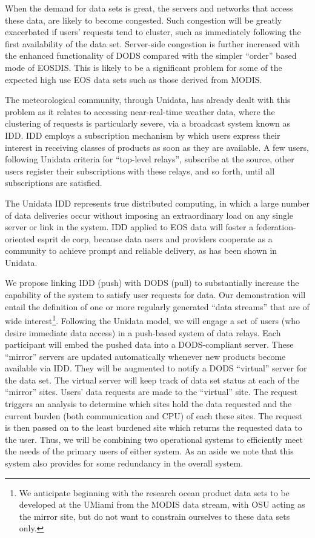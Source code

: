 \documentclass[12pt]{article}
\begin{document}
When the demand for data sets is great, the servers and networks that
access these data, are likely to become congested. Such congestion will 
be greatly exacerbated if users' requests tend to cluster, such as
immediately following the first availability of the data set. 
Server-side congestion is further increased with the enhanced
functionality of \ac{DODS} compared with the simpler ``order'' based 
mode of \acs{EOSDIS}. This is likely to be a significant problem for 
some of the expected high use \acs{EOS} data sets such as those derived 
from \acs{MODIS}. 

The meteorological community, through Unidata, has already dealt with
this problem as it relates to accessing near-real-time weather data, 
where the clustering of requests is particularly severe, via a 
broadcast system known as \ac{IDD}. \ac{IDD} employs a subscription 
mechanism by which users express their interest in receiving classes 
of products as soon as they are available. A few users, following 
Unidata criteria for ``top-level relays'', subscribe at the source, 
other users register their subscriptions with these relays, and so 
forth, until all subscriptions are satisfied.

The Unidata \ac{IDD} represents true distributed computing, in 
which a large number of data deliveries occur without imposing an 
extraordinary load on any single server or link in the system.  
\ac{IDD} applied to \acs{EOS} data will foster a federation-oriented 
esprit de corp, because data users and providers cooperate as a 
community to achieve prompt and reliable delivery, as has been shown 
in Unidata.

We propose linking \ac{IDD} (push) with \ac{DODS} (pull) to 
substantially increase the capability of the system to satisfy
user requests for data. Our demonstration will entail the definition 
of one or more regularly generated ``data streams'' that are of wide 
interest\footnote{We anticipate beginning with the research ocean 
product data sets to be developed at the \ac{UMiami} from the 
\acs{MODIS} data stream, with \ac{OSU} acting as the mirror site, 
but do not want to constrain ourselves to these data sets only.}. 
Following the Unidata model, we will engage a set of users (who 
desire immediate data access) in a push-based system of data relays. 
Each participant will embed the pushed data into a \ac{DODS}-compliant 
server. These ``mirror'' servers are updated automatically whenever 
new products become available via \ac{IDD}. They will be augmented 
to notify a \ac{DODS} ``virtual'' server for the data set. 
The virtual server will keep track of data set status at each of
the ``mirror'' sites. Users' data requests are made to the ``virtual'' 
site. The request triggers an analysis to determine which sites hold 
the data requested and the current burden (both communication and 
\acs{CPU}) of each these sites. The request is then passed on to the 
least burdened site which returns the requested data to the user. 
Thus, we will be combining two operational systems 
to efficiently meet the needs of the primary users of either system.
As an aside we note that this system also provides for some redundancy 
in the overall system.
\end{document}
